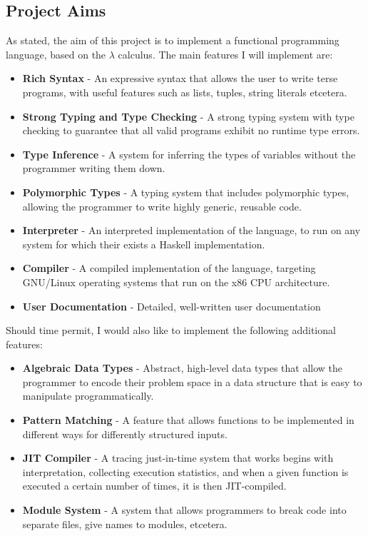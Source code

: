 \documentclass{article}
\begin{document}
\subsection{Project Aims} %
As stated, the aim of this project is to implement a functional programming language, based on the $\lambda$ calculus. The main features I will implement are:
\begin{itemize}
    \item \textbf{Rich Syntax} - An expressive syntax that allows the user to write terse programs, with useful features such as lists, tuples, string literals etcetera.
    \item \textbf{Strong Typing and Type Checking} - A strong typing system with type checking to guarantee that all valid programs exhibit no runtime type errors.
    \item \textbf{Type Inference} - A system for inferring the types of variables without the programmer writing them down.
    \item \textbf{Polymorphic Types} - A typing system that includes polymorphic types, allowing the programmer to write highly generic, reusable code.
    \item \textbf{Interpreter} - An interpreted implementation of the language, to run on any system for which their exists a Haskell implementation.
    \item \textbf{Compiler} - A compiled implementation of the language, targeting GNU/Linux operating systems that run on the x86 CPU architecture.
    \item \textbf{User Documentation} - Detailed, well-written user documentation
\end{itemize}
Should time permit, I would also like to implement the following additional features:
\begin{itemize}
    \item \textbf{Algebraic Data Types} - Abstract, high-level data types that allow the programmer to encode their problem space in a data structure that is easy to manipulate programmatically.
    \item \textbf{Pattern Matching} - A feature that allows functions to be implemented in different ways for differently structured inputs.
    \item \textbf{JIT Compiler} - A tracing just-in-time system that works begins with interpretation, collecting execution statistics, and when a given function is executed a certain number of times, it is then JIT-compiled.
    \item \textbf{Module System} - A system that allows programmers to break code into separate files, give names to modules, etcetera.
\end{itemize}
\end{document}
